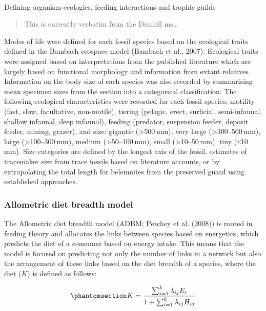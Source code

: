 \documentclass[
]{article}
\makeatletter
\let\oldparagraph\paragraph
\renewcommand{\paragraph}{
    \@ifstar
      \xxxParagraphStar
      \xxxParagraphNoStar
  }
\newcommand{\xxxParagraphStar}[1]{\oldparagraph*{#1}\mbox{}}
\newcommand{\xxxParagraphNoStar}[1]{\oldparagraph{#1}\mbox{}}
\makeatother
\begin{document}
\paragraph{Defining organism ecologies, feeding interactions and trophic
guilds}\label{defining-organism-ecologies-feeding-interactions-and-trophic-guilds}

\begin{quote}
This is currently verbatim from the Dunhill ms\ldots{}
\end{quote}

Modes of life were defined for each fossil species based on the
ecological traits defined in the Bambach ecospace model (Bambach et al.,
2007). Ecological traits were assigned based on interpretations from the
published literature which are largely based on functional morphology
and information from extant relatives. Information on the body size of
each species was also recorded by summarising mean specimen sizes from
the section into a categorical classification. The following ecological
characteristics were recorded for each fossil species; motility (fast,
slow, facultative, non-motile), tiering (pelagic, erect, surficial,
semi-infaunal, shallow infaunal, deep infaunal), feeding (predator,
suspension feeder, deposit feeder, mining, grazer), and size: gigantic
(\textgreater500 mm), very large (\textgreater300--500 mm), large
(\textgreater100--300 mm), medium (\textgreater50--100 mm), small
(\textgreater10--50 mm), tiny (≤10 mm). Size categories are defined by
the longest axis of the fossil, estimates of tracemaker size from trace
fossils based on literature accounts, or by extrapolating the total
length for belemnites from the preserved guard using established
approaches.

\subsubsection{Allometric diet breadth
model}\label{allometric-diet-breadth-model}

The Allometric diet breadth model (ADBM; Petchey et al. (2008)) is
rooted in feeding theory and allocates the links between species based
on energetics, which predicts the diet of a consumer based on energy
intake. This means that the model is focused on predicting not only the
number of links in a network but also the arrangement of these links
based on the diet breadth of a species, where the diet (\(K\)) is
defined as follows:

\begin{equation}\phantomsection\label{eq-adbm}{
K = \frac{\sum_{i=1}^{k}\lambda_{ij}E_{i}}{1+\sum_{i=1}^{k}\lambda_{ij}H_{ij}}
}\end{equation}
\end{document}
